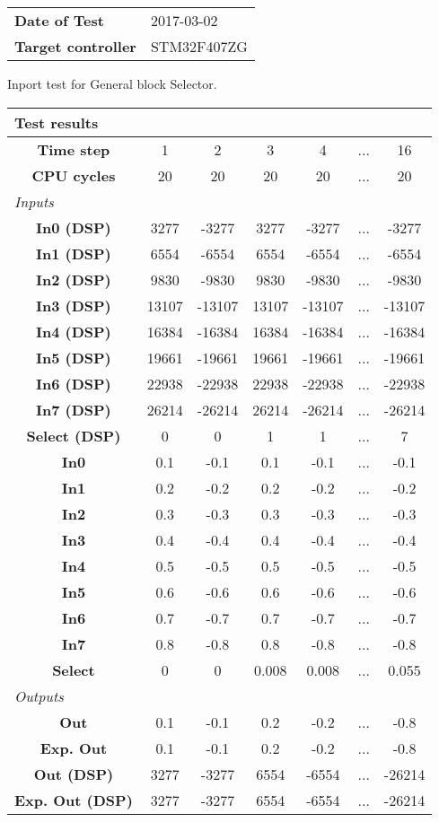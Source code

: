 \begin{tabular}{l l}
\textbf{Date of Test} & 2017-03-02 \tabularnewline
\textbf{Target controller} & STM32F407ZG \tabularnewline
\end{tabular}
\vspace{1ex}
Inport test for General block Selector.

\vspace{1em}
\begin{tabularx}{\textwidth}{|c|c|c|c|c|>{\centering\arraybackslash}X|c|}
\hline
\multicolumn{7}{|l|}{\cellcolor[gray]{0.8}\textbf{Test results}} \tabularnewline \hline
\textbf{Time step} & 1 & 2 & 3 & 4 & ... & 16 \tabularnewline \hline
\textbf{CPU cycles} & 20 & 20 & 20 & 20 & ... & 20 \tabularnewline \hline
\multicolumn{7}{|l|}{\cellcolor[gray]{0.9}\textit{Inputs}} \tabularnewline \hline
\textbf{In0 (DSP)} & 3277 & -3277 & 3277 & -3277 & ... & -3277 \tabularnewline \hline
\textbf{In1 (DSP)} & 6554 & -6554 & 6554 & -6554 & ... & -6554 \tabularnewline \hline
\textbf{In2 (DSP)} & 9830 & -9830 & 9830 & -9830 & ... & -9830 \tabularnewline \hline
\textbf{In3 (DSP)} & 13107 & -13107 & 13107 & -13107 & ... & -13107 \tabularnewline \hline
\textbf{In4 (DSP)} & 16384 & -16384 & 16384 & -16384 & ... & -16384 \tabularnewline \hline
\textbf{In5 (DSP)} & 19661 & -19661 & 19661 & -19661 & ... & -19661 \tabularnewline \hline
\textbf{In6 (DSP)} & 22938 & -22938 & 22938 & -22938 & ... & -22938 \tabularnewline \hline
\textbf{In7 (DSP)} & 26214 & -26214 & 26214 & -26214 & ... & -26214 \tabularnewline \hline
\textbf{Select (DSP)} & 0 & 0 & 1 & 1 & ... & 7 \tabularnewline \hline
\textbf{In0} & 0.1 & -0.1 & 0.1 & -0.1 & ... & -0.1 \tabularnewline \hline
\textbf{In1} & 0.2 & -0.2 & 0.2 & -0.2 & ... & -0.2 \tabularnewline \hline
\textbf{In2} & 0.3 & -0.3 & 0.3 & -0.3 & ... & -0.3 \tabularnewline \hline
\textbf{In3} & 0.4 & -0.4 & 0.4 & -0.4 & ... & -0.4 \tabularnewline \hline
\textbf{In4} & 0.5 & -0.5 & 0.5 & -0.5 & ... & -0.5 \tabularnewline \hline
\textbf{In5} & 0.6 & -0.6 & 0.6 & -0.6 & ... & -0.6 \tabularnewline \hline
\textbf{In6} & 0.7 & -0.7 & 0.7 & -0.7 & ... & -0.7 \tabularnewline \hline
\textbf{In7} & 0.8 & -0.8 & 0.8 & -0.8 & ... & -0.8 \tabularnewline \hline
\textbf{Select} & 0 & 0 & 0.008 & 0.008 & ... & 0.055 \tabularnewline \hline
\multicolumn{7}{|l|}{\cellcolor[gray]{0.9}\textit{Outputs}} \tabularnewline \hline
\textbf{Out} & 0.1 & -0.1 & 0.2 & -0.2 & ... & -0.8 \tabularnewline \hline
\textbf{Exp. Out} & 0.1 & -0.1 & 0.2 & -0.2 & ... & -0.8 \tabularnewline \hline
\textbf{Out (DSP)} & 3277 & -3277 & 6554 & -6554 & ... & -26214 \tabularnewline \hline
\textbf{Exp. Out (DSP)} & 3277 & -3277 & 6554 & -6554 & ... & -26214 \tabularnewline \hline
\end{tabularx}
\vspace{1ex}

